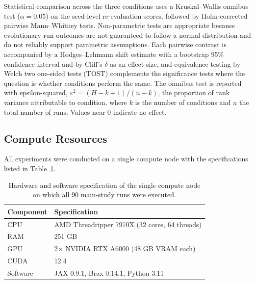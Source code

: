 \documentclass[12pt]{article}
\newcommand{\revFig}[2]{#2}
\begin{document}
Statistical comparison across the three conditions uses a Kruskal--Wallis omnibus test ($\alpha = 0.05$) on the seed-level re-evaluation scores, followed by Holm-corrected pairwise Mann--Whitney tests.
Non-parametric tests are appropriate because evolutionary run outcomes are not guaranteed to follow a normal distribution and do not reliably support parametric assumptions.
Each pairwise contrast is accompanied by a Hodges--Lehmann shift estimate with a bootstrap 95\% confidence interval and by Cliff's $\delta$ as an effect size, and equivalence testing by Welch two one-sided tests (TOST) complements the significance tests where the question is whether conditions perform the same.
The omnibus test is reported with epsilon-squared, $\varepsilon^2 = (H - k + 1)/(n - k)$, the proportion of rank variance attributable to condition, where $k$ is the number of conditions and $n$ the total number of runs. Values near $0$ indicate no effect.

\subsection{Compute Resources}
\label{subsec:compute-resources}

All experiments were conducted on a single compute node with the specifications listed in Table~\ref{tab:compute-node}.

\begin{table}[h]
\centering
\caption{\revFig{F-06c}{Hardware and software specification of the single compute node on which all 90 main-study runs were executed.}}
\label{tab:compute-node}
\begin{tabular}{ll}
\toprule
\textbf{Component} & \textbf{Specification} \\
\midrule
CPU & AMD Threadripper 7970X (32 cores, 64 threads) \\
RAM & 251 GB \\
GPU & 2$\times$ NVIDIA RTX A6000 (48 GB VRAM each) \\
CUDA & 12.4 \\
Software & JAX 0.9.1, Brax 0.14.1, Python 3.11 \\
\bottomrule
\end{tabular}
\end{table}
\end{document}
